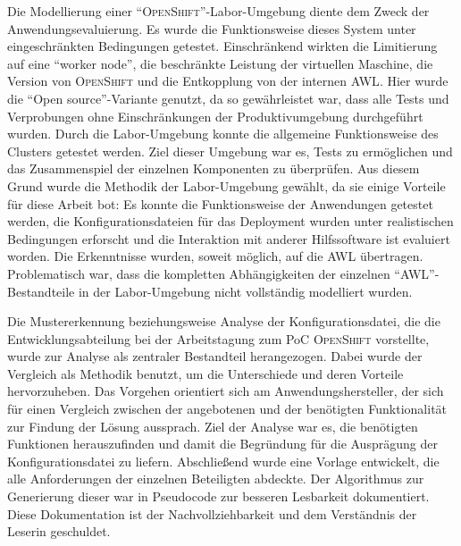 Die Modellierung einer \enquote{\textsc{OpenShift}}-Labor-Umgebung diente dem Zweck der Anwendungsevaluierung. Es wurde die Funktionsweise dieses System unter eingeschränkten Bedingungen getestet. Einschränkend wirkten die Limitierung auf eine \enquote{worker node}, die beschränkte Leistung der virtuellen Maschine, die Version von \textsc{OpenShift} und die Entkopplung von der internen \ac{AWL}. Hier wurde die \enquote{Open source}-Variante genutzt, da so gewährleistet war, dass alle Tests und Verprobungen ohne Einschränkungen der Produktivumgebung durchgeführt wurden. Durch die Labor-Umgebung konnte die allgemeine Funktionsweise des Clusters getestet werden. Ziel dieser Umgebung war es, Tests zu ermöglichen und das Zusammenspiel der einzelnen Komponenten zu überprüfen. Aus diesem Grund wurde die Methodik der Labor-Umgebung gewählt, da sie einige Vorteile für diese Arbeit bot: Es konnte die Funktionsweise der Anwendungen getestet werden, die Konfigurationsdateien für das Deployment wurden unter realistischen Bedingungen erforscht und die Interaktion mit anderer Hilfssoftware ist evaluiert worden. Die Erkenntnisse wurden, soweit möglich, auf die \ac{AWL} übertragen. Problematisch war, dass die kompletten Abhängigkeiten der einzelnen \enquote{\ac{AWL}}-Bestandteile in der Labor-Umgebung nicht vollständig modelliert wurden.
\par
Die Mustererkennung beziehungsweise Analyse der Konfigurationsdatei, die die Entwicklungsabteilung bei der Arbeitstagung zum \ac{PoC} \textsc{OpenShift} vorstellte, wurde zur Analyse als zentraler Bestandteil herangezogen. Dabei wurde der Vergleich als Methodik benutzt, um die Unterschiede und deren Vorteile hervorzuheben. Das Vorgehen orientiert sich am Anwendungshersteller, der sich für einen Vergleich zwischen der angebotenen und der benötigten Funktionalität zur Findung der Lösung aussprach.\autocite[vgl.][Application\,$\rightarrow$\,Deployments]{red_hat_inc_okd_2019} Ziel der Analyse war es, die benötigten Funktionen herauszufinden und damit die Begründung für die Ausprägung der Konfigurationsdatei zu liefern. Abschließend wurde eine Vorlage entwickelt, die alle Anforderungen der einzelnen Beteiligten abdeckte. Der Algorithmus zur Generierung dieser war in Pseudocode zur besseren Lesbarkeit dokumentiert. Diese Dokumentation ist der Nachvollziehbarkeit und dem Verständnis der Leserin geschuldet.
\par

